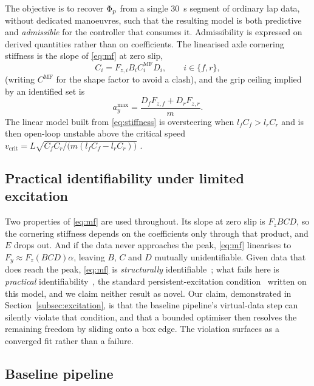 The objective is to recover $\Phi_{p}$ from a single \SI{30}{\second} segment of
ordinary lap data, without dedicated manoeuvres, such that the resulting model
is both predictive and \emph{admissible} for the controller that consumes it.
Admissibility is expressed on derived quantities rather than on coefficients.
The linearised axle cornering stiffness is the slope of \eqref{eq:mf} at zero
slip,
\begin{equation}
C_{i}=F_{z,i}B_{i}C_{i}^{\mathrm{MF}}D_{i},\qquad i\in\{f,r\},
\label{eq:stiffness}
\end{equation}
(writing $C^{\mathrm{MF}}$ for the shape factor to avoid a clash), and the grip
ceiling implied by an identified set is
\begin{equation}
a_{y}^{\max}=\frac{D_{f}F_{z,f}+D_{r}F_{z,r}}{m}.
\label{eq:gripceiling}
\end{equation}
The linear model built from \eqref{eq:stiffness} is oversteering when
$l_{f}C_{f}>l_{r}C_{r}$ and is then open-loop unstable above the critical speed
$v_{\mathrm{crit}}=L\sqrt{C_{f}C_{r}/\big(m(l_{f}C_{f}-l_{r}C_{r})\big)}$
\cite{rajamani2012}.

\subsection{Practical identifiability under limited excitation}
\label{subsec:identifiability}

Two properties of \eqref{eq:mf} are used throughout. Its slope at zero
slip is $F_{z}BCD$, so the cornering stiffness depends on the coefficients only
through that product, and $E$ drops out. And if the data
never approaches the peak, \eqref{eq:mf} linearises to $F_{y}\approx
F_{z}(BCD)\alpha$, leaving $B$, $C$ and $D$ mutually unidentifiable. Given data
that does reach the peak, \eqref{eq:mf} is \emph{structurally}
identifiable~\cite{bellman1970structural}; what fails here is \emph{practical}
identifiability~\cite{raue2009practical}, the standard persistent-excitation
condition~\cite{ljung1999sysid,astrom1995adaptive} written on this model, and we
claim neither result as novel. Our claim, demonstrated in
Section~\ref{subsec:excitation}, is that the baseline pipeline's virtual-data
step can silently violate that condition, and that a bounded optimiser then
resolves the remaining freedom by sliding onto a box edge. The violation
surfaces as a converged fit rather than a failure.

\subsection{Baseline pipeline}
\label{subsec:baseline}

